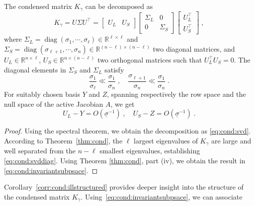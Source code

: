 \documentclass[smallextended]{svjour3}
\DeclareMathOperator{\diag}{diag}
\begin{document}
\begin{corollary}
  \label{corr:cond:illstructured}
  The condensed matrix $K_\gamma$ can be decomposed as
  \begin{equation}
    \label{eq:cond:svd}
    K_\gamma = U \Sigma U^\top = \begin{bmatrix} U_L & U_S \end{bmatrix}
    \begin{bmatrix}
      \Sigma_L & 0 \\ 0 & \Sigma_S
    \end{bmatrix}
    \begin{bmatrix}
      U_L^\top \\ U_S^\top
    \end{bmatrix}
    \; ,
  \end{equation}
  where $\Sigma_L = \diag(\sigma_1, \cdots, \sigma_\ell) \in \mathbb{R}^{\ell \times \ell}$ and $\Sigma_S  = \diag(\sigma_{\ell+1}, \cdots, \sigma_n)\in \mathbb{R}^{(n-\ell) \times (n-\ell)}$
  two diagonal matrices, and $U_L \in \mathbb{R}^{n \times \ell}$,
  $U_S \in \mathbb{R}^{n \times (n - \ell)}$ two
  orthogonal matrices such that $U_L^\top U_S = 0$.
  The diagonal elements in $\Sigma_S$ and $\Sigma_L$ satisfy
  \begin{equation}
    \label{eq:cond:svddiag}
    \frac{\sigma_1}{\sigma_\ell} \ll \frac{\sigma_1}{\sigma_n} \; , \quad
    \frac{\sigma_{\ell +1}}{\sigma_{n}} \ll \frac{\sigma_1}{\sigma_n} \; .
  \end{equation}
  For suitably chosen basis $Y$ and $Z$,
  spanning respectively the row space and the null space of
  the active Jacobian $A$, we get
  \begin{equation}
    \label{eq:cond:invariantsubpsace}
    U_L - Y = O(\underline{\sigma}^{-1}) \; , \quad
    U_S - Z = O(\underline{\sigma}^{-1}) \; .
  \end{equation}
\end{corollary}
\begin{proof}
  Using the spectral theorem, we obtain the decomposition as \eqref{eq:cond:svd}.
  According to Theorem~\ref{thm:cond}, the $\ell$ largest eigenvalues of $K_\gamma$ are large
  and well separated from the $n - \ell$ smallest eigenvalues,
  establishing \eqref{eq:cond:svddiag}.
  Using Theorem \ref{thm:cond}, part (iv), we obtain the result
  in \eqref{eq:cond:invariantsubpsace}.
\end{proof}
Corollary~\ref{corr:cond:illstructured} provides deeper insight into the structure
of the condensed matrix $K_\gamma$.
Using~\eqref{eq:cond:invariantsubpsace}, we can associate
\end{document}
